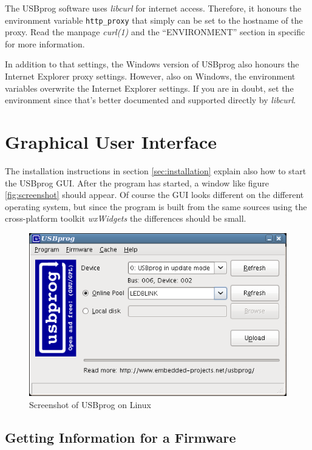 \documentclass[bibtotoc,UKenglish,halfparskip,oneside,DIV12]{scrreprt}
\begin{document}
The USBprog software uses \emph{libcurl} for internet access. Therefore, it honours the environment
variable \texttt{http\_proxy} that simply can be set to the hostname of the proxy. Read the manpage
\emph{curl(1)} and the ``ENVIRONMENT'' section in specific for more information.

In addition to that settings, the Windows version of USBprog also honours the Internet Explorer proxy
settings. However, also on Windows, the environment variables overwrite the Internet Explorer
settings. If you are in doubt, set the environment since that's better documented and supported
directly by \emph{libcurl}.



\section{Graphical User Interface}
\label{sec:gui}

The installation instructions in section \vref{sec:installation} explain also how to start the
USBprog GUI. After the program has started, a window like figure \vref{fig:screenshot} should
appear. Of course the GUI looks different on the different operating system, but since the program
is built from the same sources using the cross-platform toolkit \emph{wxWidgets} the differences
should be small.

\begin{figure}[bp]
  \centering
  \includegraphics[scale=0.5]{images/usbprog_gui.png}
  \caption{Screenshot of USBprog on Linux}
  \label{fig:screenshot}
\end{figure}



\subsection{Getting Information for a Firmware}
\end{document}
